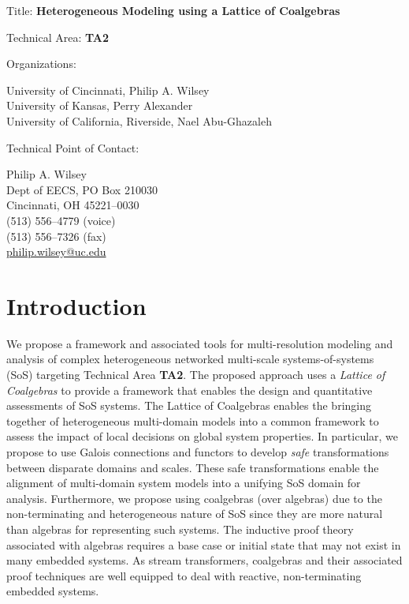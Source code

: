 \documentclass[12pt]{article}
\begin{document}
\noindent
{\Large Title: \textbf{Heterogeneous Modeling using a Lattice of Coalgebras}}

\bigskip
\bigskip
\bigskip
\bigskip
\bigskip

\noindent
Technical Area: \textbf{TA2}

\bigskip
\bigskip
\bigskip
\bigskip

\noindent
Organizations: \begin{minipage}[t]{4in}
  \textsf{University of Cincinnati, Philip A. Wilsey} \\
  \textsf{University of Kansas, Perry Alexander} \\
  \textsf{University of California, Riverside, Nael Abu-Ghazaleh}
\end{minipage}

\bigskip
\bigskip
\bigskip
\bigskip

\noindent
Technical Point of Contact: \begin{minipage}[t]{4in}
  Philip A. Wilsey \\
  Dept of EECS, PO Box 210030 \\
  Cincinnati, OH 45221--0030 \\
  (513) 556--4779 (voice) \\
  (513) 556--7326 (fax) \\
  \url{philip.wilsey@uc.edu}
\end{minipage}

\clearpage

\section{Introduction}

We propose a framework and associated tools for multi-resolution modeling and analysis of
complex heterogeneous networked multi-scale systems-of-systems (SoS) targeting Technical
Area \textbf{TA2}.  The proposed approach uses a \emph{Lattice of Coalgebras} to provide a
framework that enables the design and quantitative assessments of SoS systems.  The
Lattice of Coalgebras enables the bringing together of heterogeneous multi-domain models
into a common framework to assess the impact of local decisions on global system
properties.  In particular, we propose to use Galois connections and functors to develop
\emph{safe} transformations between disparate domains and scales.  These safe
transformations enable the alignment of multi-domain system models into a unifying SoS
domain for analysis.  Furthermore, we propose using coalgebras (over algebras) due to the
non-terminating and heterogeneous nature of SoS since they are more natural than algebras
for representing such systems.  The inductive proof theory associated with algebras
requires a base case or initial state that may not exist in many embedded systems.  As
stream transformers, coalgebras and their associated proof techniques are well equipped to
deal with reactive, non-terminating embedded systems.
\end{document}
